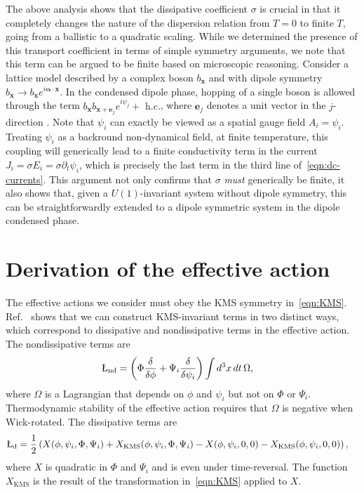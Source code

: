 The above analysis shows that the dissipative coefficient $\sigma$ is crucial in that it completely changes the nature of the dispersion relation from $T=0$ to finite $T$, going from a ballistic to a quadratic scaling. While we determined the presence of this transport coefficient in terms of simple symmetry arguments, we note that this term can be argued to be finite based on microscopic reasoning. Consider a lattice model described by a complex boson $b_{\bm x}$ and with dipole symmetry $b_{\bm x}\to b_{\bm x} e^{i {\bm \alpha}\cdot {\bm x}}$. In the condensed dipole phase, hopping of a single boson is allowed through the term $b_{\bm x}b_{\bm x+\bm e_j}e^{i\psi_j}+\text{ h.c.}$, where $\bm e_j$ denotes a unit vector in the $j$-direction \cite{Lake2022Dipolar}. Note that $\psi_i$ can exactly be viewed as a spatial gauge field $A_i=\psi_i$. Treating $\psi_i$ as a backround non-dynamical field, at finite temperature, this coupling will generically lead to a finite conductivity term in the current $J_i=\sigma E_i=\sigma\partial_t \psi_i$, which is precisely the last term in the third line of~\eqref{eqn:dc-currents}. This argument not only confirms that $\sigma$ \emph{must} generically be finite, it also shows that, given a $U(1)$-invariant system without dipole symmetry, this can be straightforwardly extended to a dipole symmetric system in the dipole condensed phase.

\section{Derivation of the effective action}

The effective actions we consider must obey the KMS symmetry in~\eqref{eqn:KMS}. Ref.~\cite{Kapustin2022Hohenberg} shows that we can construct KMS-invariant terms in two distinct ways, which correspond to dissipative and nondissipative terms in the effective action. The nondissipative terms are
\begin{align}
\L_\text{nd} &= \left( \Phi \frac{\delta}{\delta \phi} + \Psi_i \frac{\delta}{\delta \psi_i} \right) \int d^3x\, dt\, \Omega,
\end{align}
where $\Omega$ is a Lagrangian that depends on $\phi$ and $\psi_i$ but not on $\Phi$ or $\Psi_i$. Thermodynamic stability of the effective action requires that $\Omega$ is negative when Wick-rotated. The dissipative terms are
\begin{align}
\L_\text{d} &= \frac{1}{2} \left( X(\phi,\psi_i,\Phi,\Psi_i) + X_\text{KMS}(\phi,\psi_i,\Phi,\Psi_i) - X(\phi,\psi_i,0,0) - X_\text{KMS}(\phi,\psi_i,0,0) \right),
\end{align}
where $X$ is quadratic in $\Phi$ and $\Psi_i$ and is even under time-reversal. The function $X_\text{KMS}$ is the result of the transformation in~\eqref{eqn:KMS} applied to $X$.

